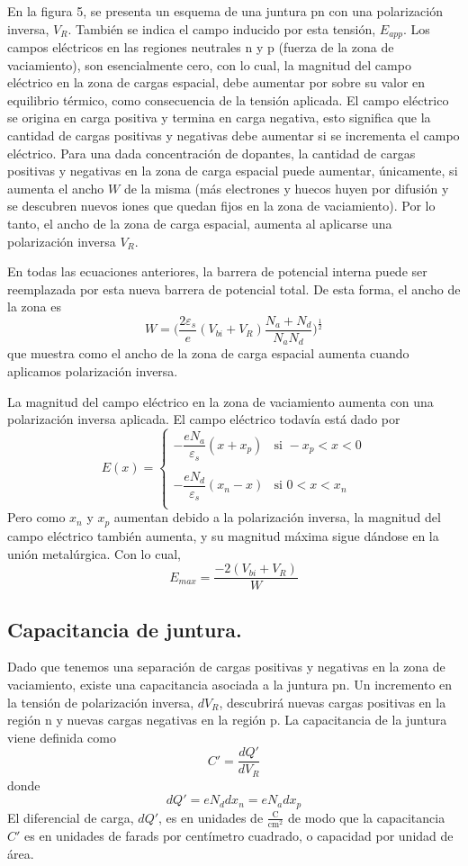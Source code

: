 \documentclass[12pt,a4paper]{article}
\begin{document}
En la figura 5, se presenta un esquema de una juntura pn con una polarización inversa, $V_{R}$. También se indica el campo inducido por esta tensión, $E_{app}$. Los campos eléctricos en las regiones neutrales n y p (fuerza de la zona de vaciamiento), son esencialmente cero, con lo cual, la magnitud del campo eléctrico en la zona de cargas espacial, debe aumentar por sobre su valor en equilibrio térmico, como consecuencia de la tensión aplicada. El campo eléctrico se origina en carga positiva y termina en carga negativa, esto significa que la cantidad de cargas positivas y negativas debe aumentar si se incrementa el campo eléctrico. Para una dada concentración de dopantes, la cantidad de cargas positivas y negativas en la zona de carga espacial puede aumentar, únicamente, si aumenta el ancho $W$ de la misma (más electrones y huecos huyen por difusión y se descubren nuevos iones que quedan fijos en la zona de vaciamiento). Por lo tanto, el ancho de la zona de carga espacial, aumenta al aplicarse una polarización inversa $V_{R}$.

En todas las ecuaciones anteriores, la barrera de potencial interna puede ser reemplazada por esta nueva barrera de potencial total. De esta forma, el ancho de la zona es
\[ W = \bigg( \frac{2 \varepsilon _{s}}{e} (V_{bi}+V_{R}) \frac{N_{a}+N_{d}}{N_{a}N_{d}} \bigg)^{\frac{1}{2}} \]
que muestra como el ancho de la zona de carga espacial aumenta cuando aplicamos polarización inversa.

La magnitud del campo eléctrico en la zona de vaciamiento aumenta con una polarización inversa aplicada. El campo eléctrico todavía está dado por
\[ E (x)=\left\{ \begin{array}{ll}
-\dfrac{eN_{a}}{\varepsilon _{s}} (x+x_{p}) & \textrm{si } -x_{p}<x<0 \\
 & \\
-\dfrac{eN_{d}}{\varepsilon _{s}} (x_{n}-x) & \textrm{si } 0<x<x_{n} \\
\end{array} \right.\]
Pero como $x_{n}$ y $x_{p}$ aumentan debido a la polarización inversa, la magnitud del campo eléctrico también aumenta, y su magnitud máxima sigue dándose en la unión metalúrgica. Con lo cual,
\[ E_{max} = \frac{-2(V_{bi}+V_{R})}{W} \]

\subsection{Capacitancia de juntura.}

Dado que tenemos una separación de cargas positivas y negativas en la zona de vaciamiento, existe una capacitancia asociada a la juntura pn. Un incremento en la tensión de polarización inversa, $dV_{R}$, descubrirá nuevas cargas positivas en la región n y nuevas cargas negativas en la región p. La capacitancia de la juntura viene definida como
\[ C'=\frac{dQ'}{dV_{R}} \]
donde
\[ dQ'=eN_{d}dx_{n}=eN_{a}dx_{p} \]
El diferencial de carga, $dQ'$, es en unidades de $\frac{\textrm{C}}{\textrm{cm}^{2}}$ de modo que la capacitancia $C'$ es en unidades de farads por centímetro cuadrado, o capacidad por unidad de área.
\end{document}
